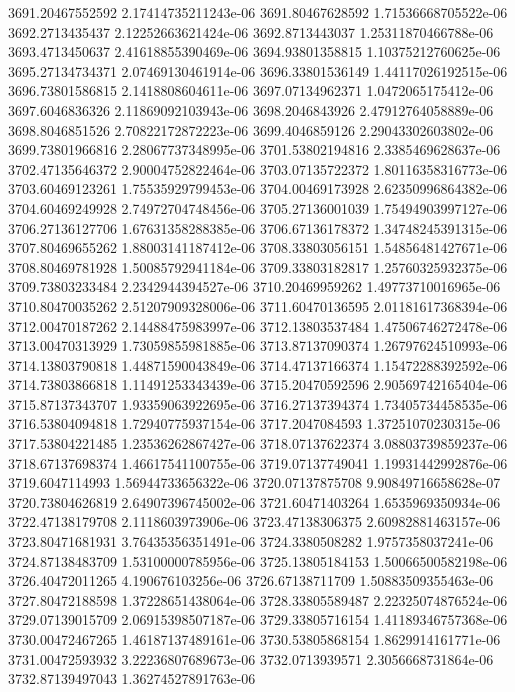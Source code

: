{3691.20467552592 2.17414735211243e-06
3691.80467628592 1.71536668705522e-06
3692.2713435437 2.12252663621424e-06
3692.8713443037 1.25311870466788e-06
3693.4713450637 2.41618855390469e-06
3694.93801358815 1.10375212760625e-06
3695.27134734371 2.07469130461914e-06
3696.33801536149 1.44117026192515e-06
3696.73801586815 2.1418808604611e-06
3697.07134962371 1.0472065175412e-06
3697.6046836326 2.11869092103943e-06
3698.2046843926 2.47912764058889e-06
3698.8046851526 2.70822172872223e-06
3699.4046859126 2.29043302603802e-06
3699.73801966816 2.28067737348995e-06
3701.53802194816 2.3385469628637e-06
3702.47135646372 2.90004752822464e-06
3703.07135722372 1.80116358316773e-06
3703.60469123261 1.75535929799453e-06
3704.00469173928 2.62350996864382e-06
3704.60469249928 2.74972704748456e-06
3705.27136001039 1.75494903997127e-06
3706.27136127706 1.67631358288385e-06
3706.67136178372 1.34748245391315e-06
3707.80469655262 1.88003141187412e-06
3708.33803056151 1.54856481427671e-06
3708.80469781928 1.50085792941184e-06
3709.33803182817 1.25760325932375e-06
3709.73803233484 2.2342944394527e-06
3710.20469959262 1.49773710016965e-06
3710.80470035262 2.51207909328006e-06
3711.60470136595 2.01181617368394e-06
3712.00470187262 2.14488475983997e-06
3712.13803537484 1.47506746272478e-06
3713.00470313929 1.73059855981885e-06
3713.87137090374 1.26797624510993e-06
3714.13803790818 1.44871590043849e-06
3714.47137166374 1.15472288392592e-06
3714.73803866818 1.11491253343439e-06
3715.20470592596 2.90569742165404e-06
3715.87137343707 1.93359063922695e-06
3716.27137394374 1.73405734458535e-06
3716.53804094818 1.72940775937154e-06
3717.2047084593 1.37251070230315e-06
3717.53804221485 1.23536262867427e-06
3718.07137622374 3.08803739859237e-06
3718.67137698374 1.46617541100755e-06
3719.07137749041 1.19931442992876e-06
3719.6047114993 1.56944733656322e-06
3720.07137875708 9.90849716658628e-07
3720.73804626819 2.64907396745002e-06
3721.60471403264 1.6535969350934e-06
3722.47138179708 2.1118603973906e-06
3723.47138306375 2.60982881463157e-06
3723.80471681931 3.76435356351491e-06
3724.3380508282 1.9757358037241e-06
3724.87138483709 1.53100000785956e-06
3725.13805184153 1.50066500582198e-06
3726.40472011265 4.190676103256e-06
3726.67138711709 1.50883509355463e-06
3727.80472188598 1.37228651438064e-06
3728.33805589487 2.22325074876524e-06
3729.07139015709 2.06915398507187e-06
3729.33805716154 1.41189346757368e-06
3730.00472467265 1.46187137489161e-06
3730.53805868154 1.8629914161771e-06
3731.00472593932 3.22236807689673e-06
3732.0713939571 2.3056668731864e-06
3732.87139497043 1.36274527891763e-06
}
